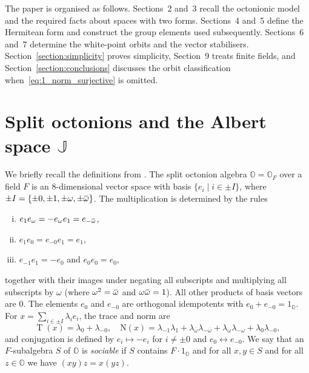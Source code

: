 \documentclass{amsart}
\def\ombb{\mathord{\mbox{\hspace*{0pt}}\;\!\overline{\!\!\:\omega\!\!\:}\;\!}\mbox{\hspace*{0pt}}}
\def\NN{\mathord{\mathrm{N}}}
\def\OO{\mathord{\mathbb{O}}}
\newcommand{\omg}{\overline{\omega}}
\newcommand{\Tr}{\operatorname{T}}
\newcommand{\J}{\mathbb{J}}
\theoremstyle{plain}
\numberwithin{theorem}{section}
\theoremstyle{definition}
\begin{document}
The paper is organised as follows. Sections~2 and~3 recall the
octonionic model and the required facts about spaces with two forms.
Sections~4 and~5 define the Hermitean form and construct the group
elements used subsequently. Sections~6 and~7 determine the white-point
orbits and the vector stabilisers. Section~\ref{section:simplicity}
proves simplicity, Section~9 treats finite fields, and
Section~\ref{section:conclusions} discusses the orbit classification
when~\eqref{eq:1_norm_surjective} is omitted.

\section{Split octonions and the Albert space $\J$}

We briefly recall the definitions from \cite{BSW1}. The split octonion algebra $\OO = \OO_F$
over a field $F$ is an $8$-dimensional vector space with basis $\{e_i \mid i \in \pm I\}$,
where \mbox{$\pm I = \{\pm 0, \pm 1, \pm \omega, \pm \ombb\}$}.
The multiplication is determined by the rules
\begin{enumerate}[(i)]
	\item $e_1 e_{\omega} = -e_{\omega} e_1 = e_{-\ombb}$,
	\item $e_1 e_0 = e_{-0} e_1 = e_1$,
	\item $e_{-1} e_1 = -e_0$ and $e_0 e_0 = e_0$,
\end{enumerate}
together with their images under negating all subscripts and multiplying all subscripts
by $\omega$ (where $\omega^2 = \ombb$ and $\omega \ombb = 1$). All other products of
basis vectors are $0$.
The elements $e_0$ and $e_{-0}$ are orthogonal idempotents with $e_0 + e_{-0} = 1_{\OO}$.
For $x = \sum_{i \in \pm I} \lambda_i e_i$, the trace and norm are
\begin{equation}
	\Tr(x) = \lambda_0 + \lambda_{-0}, \quad
	\NN(x) = \lambda_{-1} \lambda_1 + \lambda_{\omg} \lambda_{-\omg} +
		\lambda_{\omega}\lambda_{-\omega} + \lambda_0 \lambda_{-0},
\end{equation}
and conjugation is defined by $e_i \mapsto -e_i$ for $i \neq \pm 0$ and $e_0 \leftrightarrow e_{-0}$.
We say that an $F$-subalgebra $S$ of $\OO$ is \textit{sociable} if $S$ contains $F \cdot 1_{\OO}$ and
for all $x,y \in S$ and for all $z \in \OO$ we have $(xy)z = x(yz)$.
\end{document}

